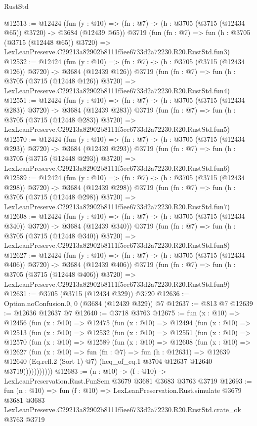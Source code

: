 \begin{lexlean}{RustStd}
\begin{coremodule}
@12513 := @12424
    (fun (y : @10) => (fn : @7) -> (h : @3705 (@3715 (@12434 @65)) @3720) -> @3684 (@12439 @65))
    @3719
    (fun (fn : @7) =>
    fun (h : @3705 (@3715 (@12448 @65)) @3720) =>
    LexLeanPreserve.C29213a82902b8111f5ee6733d2a72230.R20.RustStd.fun3)
@12532 := @12424
    (fun (y : @10) => (fn : @7) -> (h : @3705 (@3715 (@12434 @126)) @3720) -> @3684 (@12439 @126))
    @3719
    (fun (fn : @7) =>
    fun (h : @3705 (@3715 (@12448 @126)) @3720) =>
    LexLeanPreserve.C29213a82902b8111f5ee6733d2a72230.R20.RustStd.fun4)
@12551 := @12424
    (fun (y : @10) => (fn : @7) -> (h : @3705 (@3715 (@12434 @283)) @3720) -> @3684 (@12439 @283))
    @3719
    (fun (fn : @7) =>
    fun (h : @3705 (@3715 (@12448 @283)) @3720) =>
    LexLeanPreserve.C29213a82902b8111f5ee6733d2a72230.R20.RustStd.fun5)
@12570 := @12424
    (fun (y : @10) => (fn : @7) -> (h : @3705 (@3715 (@12434 @293)) @3720) -> @3684 (@12439 @293))
    @3719
    (fun (fn : @7) =>
    fun (h : @3705 (@3715 (@12448 @293)) @3720) =>
    LexLeanPreserve.C29213a82902b8111f5ee6733d2a72230.R20.RustStd.fun6)
@12589 := @12424
    (fun (y : @10) => (fn : @7) -> (h : @3705 (@3715 (@12434 @298)) @3720) -> @3684 (@12439 @298))
    @3719
    (fun (fn : @7) =>
    fun (h : @3705 (@3715 (@12448 @298)) @3720) =>
    LexLeanPreserve.C29213a82902b8111f5ee6733d2a72230.R20.RustStd.fun7)
@12608 := @12424
    (fun (y : @10) => (fn : @7) -> (h : @3705 (@3715 (@12434 @340)) @3720) -> @3684 (@12439 @340))
    @3719
    (fun (fn : @7) =>
    fun (h : @3705 (@3715 (@12448 @340)) @3720) =>
    LexLeanPreserve.C29213a82902b8111f5ee6733d2a72230.R20.RustStd.fun8)
@12627 := @12424
    (fun (y : @10) => (fn : @7) -> (h : @3705 (@3715 (@12434 @406)) @3720) -> @3684 (@12439 @406))
    @3719
    (fun (fn : @7) =>
    fun (h : @3705 (@3715 (@12448 @406)) @3720) =>
    LexLeanPreserve.C29213a82902b8111f5ee6733d2a72230.R20.RustStd.fun9)
@12631 := @3705 (@3715 (@12434 @329)) @3720
@12636 := Option.noConfusion.{0, 0} (@3684 (@12439 @329)) @7
@12637 := @813 @7
@12639 := @12636 @12637 @7
@12640 := @3718 @3763
@12675 := fun (x : @10) =>
  @12456
    (fun (x : @10) =>
    @12475
      (fun (x : @10) =>
      @12494
        (fun (x : @10) =>
        @12513
          (fun (x : @10) =>
          @12532
            (fun (x : @10) =>
            @12551
              (fun (x : @10) =>
              @12570
                (fun (x : @10) =>
                @12589
                  (fun (x : @10) =>
                  @12608
                    (fun (x : @10) =>
                    @12627
                      (fun (x : @10) =>
                      fun (fn : @7) =>
                      fun (h : @12631) =>
                      @12639
                        @12640
                        (Eq.refl.{2} (Sort 1) @7)
                        (heq_of_eq.{1} @3704 @12637 @12640 @3719)))))))))))
@12683 := (n : @10) -> (f : @10) -> LexLeanPreservation.Rust.FunSem @3679 @3681 @3683 @3763 @3719
@12693 := fun (n : @10) =>
  fun (f : @10) =>
  LexLeanPreservation.Rust.simulate
    @3679
    @3681
    @3683
    LexLeanPreserve.C29213a82902b8111f5ee6733d2a72230.R20.RustStd.crate_ok
    @3763
    @3719
\end{coremodule}
\end{lexlean}

